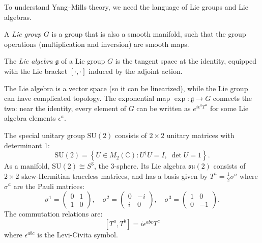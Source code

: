 To understand Yang--Mills theory, we need the language of Lie groups and Lie algebras.

\begin{definition}
A \textit{Lie group} $G$ is a group that is also a smooth manifold, such that the group operations (multiplication and inversion) are smooth maps.
\end{definition}

\begin{definition}
The \textit{Lie algebra} $\mathfrak{g}$ of a Lie group $G$ is the tangent space at the identity, equipped with the Lie bracket $[\cdot, \cdot]$ induced by the adjoint action.
\end{definition}

The Lie algebra is a vector space (so it can be linearized), while the Lie group can have complicated topology. The exponential map $\exp: \mathfrak{g} \to G$ connects the two: near the identity, every element of $G$ can be written as $e^{i\epsilon^a T^a}$ for some Lie algebra elements $\epsilon^a$.

\begin{example}[$\mathrm{SU}(2)$]
The special unitary group $\mathrm{SU}(2)$ consists of $2 \times 2$ unitary matrices with determinant 1:
\[
\mathrm{SU}(2) = \left\{ U \in M_2(\mathbb{C}) : U^\dagger U = I,\; \det U = 1 \right\}.
\]
As a manifold, $\mathrm{SU}(2) \cong S^3$, the 3-sphere. Its Lie algebra $\mathfrak{su}(2)$ consists of $2 \times 2$ skew-Hermitian traceless matrices, and has a basis given by $T^a = \frac{1}{2}\sigma^a$ where $\sigma^a$ are the Pauli matrices:
\[
\sigma^1 = \begin{pmatrix} 0 & 1 \\ 1 & 0 \end{pmatrix}, \quad
\sigma^2 = \begin{pmatrix} 0 & -i \\ i & 0 \end{pmatrix}, \quad
\sigma^3 = \begin{pmatrix} 1 & 0 \\ 0 & -1 \end{pmatrix}.
\]
The commutation relations are:
\[
[T^a, T^b] = i\epsilon^{abc} T^c
\]
where $\epsilon^{abc}$ is the Levi-Civita symbol.
\end{example}

